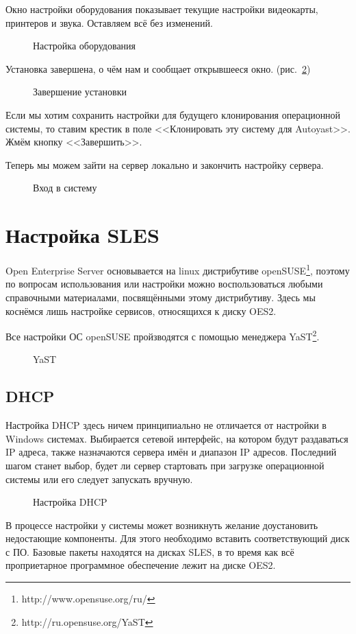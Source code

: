 Окно настройки оборудования показывает текущие настройки видеокарты, принтеров и звука. Оставляем всё без изменений.
\begin{figure}[H]
\caption{Настройка оборудования}
\label{fig14}
\end{figure}
\clearpage

Установка завершена, о чём нам и сообщает открывшееся окно. (рис.~\ref{fig15})
\begin{figure}[H]
\caption{Завершение установки}
\label{fig15}
\end{figure}
Если мы хотим сохранить настройки для будущего клонирования операционной
системы, то ставим крестик в поле <<Клонировать эту систему для Autoyast>>. Жмём кнопку <<Завершить>>.
\clearpage

Теперь мы можем зайти на сервер локально и закончить настройку сервера.
\begin{figure}[H]
\caption{Вход в систему}
\label{fig16}
\end{figure}
\clearpage

\chapter{Настройка SLES}
Open Enterprise Server основывается на linux дистрибутиве openSUSE\footnote{http://www.opensuse.org/ru/}, поэтому по вопросам использования или настройки можно воспользоваться любыми справочными материалами, посвящёнными этому дистрибутиву. Здесь мы коснёмся лишь настройке сервисов, относящихся к диску OES2.\par 
Все настройки ОС openSUSE пройзводятся с помощью менеджера YaST\footnote{http://ru.opensuse.org/YaST}.
\begin{figure}[H]
\caption{YaST}
\label{yast}
\end{figure}
\clearpage

\section{DHCP}
Настройка DHCP здесь ничем принципиально не отличается от настройки в Windows системах. Выбирается сетевой интерфейс, на котором будут раздаваться IP адреса, также назначаются сервера имён и диапазон IP адресов. Последний шагом станет выбор, будет ли сервер стартовать при загрузке операционной системы или его следует запускать вручную.
\begin{figure}[H]
\caption{Настройка DHCP}
\label{dhcp}
\end{figure}
В процессе настройки у системы может возникнуть желание доустановить недостающие компоненты. Для этого необходимо вставить соответствующий диск с ПО. Базовые пакеты находятся на дисках SLES, в то время как всё проприетарное программное обеспечение лежит на диске OES2.
\clearpage

